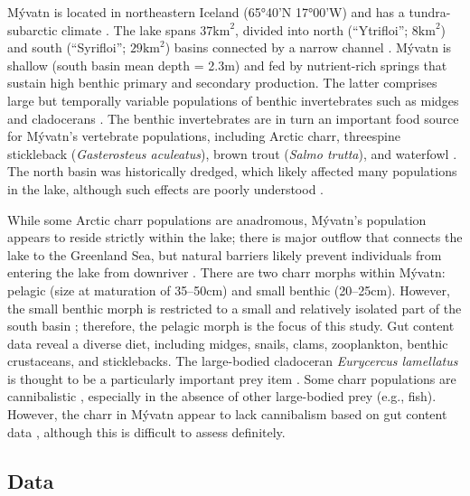 \documentclass[11pt]{article}
\begin{document}
M\'{y}vatn is located in northeastern Iceland (65°40’N 17°00’W) 
and has a tundra-subarctic climate \citep{bjornsson2004climate, einarsson2004myvatn}. 
The lake spans $37 \text{km}^2$, 
divided into north (``Ytrifloi''; $8 \text{km}^2$) 
and south (``Sy{\dh}rifloi''; $29 \text{km}^2$) basins 
connected by a narrow channel \citep{einarsson2004myvatn}. 
M\'{y}vatn is shallow (south basin mean depth = 2.3m) and 
fed by nutrient-rich springs that sustain high benthic primary and secondary production.
The latter comprises large but temporally variable populations of benthic invertebrates 
such as midges and cladocerans \citep{einarsson2004clad, gardarsson2004population}.
The benthic invertebrates are in turn 
an important food source for M\'{y}vatn’s vertebrate populations, 
including Arctic charr, threespine stickleback (\emph{Gasterosteus aculeatus}), 
brown trout (\emph{Salmo trutta}), and waterfowl \citep{einarsson2004myvatn}. 
The north basin was historically dredged, 
which likely affected many populations in the lake, 
although such effects are poorly understood \citep{einarsson2004myvatn}.

While some Arctic charr populations are anadromous, 
M\'{y}vatn’s population appears to reside strictly within the lake; 
there is major outflow that connects the lake to the Greenland Sea,
but natural barriers likely prevent individuals from entering the lake from downriver
\citep{gudbergsson2004}. 
There are two charr morphs within M\'{y}vatn: pelagic (size at maturation of 35--50cm) 
and small benthic (20--25cm). However, the small benthic morph is restricted to a small 
and relatively isolated part of the south basin \citep{gudbergsson2004}; 
therefore, the pelagic morph is the focus of this study. 
Gut content data reveal a diverse diet, including midges, snails, clams, zooplankton, 
benthic crustaceans, and sticklebacks. 
The large-bodied cladoceran \emph{Eurycercus lamellatus} 
is thought to be a particularly important prey item 
\citep{gudbergsson2004}. 
Some charr populations are cannibalistic \citep{klemetsen2003atlantic}, 
especially in the absence of other large-bodied prey (e.g., fish).
However, the charr in M\'{y}vatn appear to lack cannibalism based on gut content data
\citep{gudbergsson2004}, although this is difficult to assess definitely. 

\subsection*{Data} 
\end{document}
